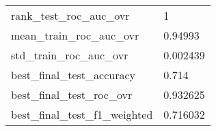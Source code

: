 \begin{tabular}{ll}
rank\_test\_roc\_auc\_ovr       &                                                  1 \\
mean\_train\_roc\_auc\_ovr      &                                            0.94993 \\
std\_train\_roc\_auc\_ovr       &                                           0.002439 \\
best\_final\_test\_accuracy    &                                              0.714 \\
best\_final\_test\_roc\_ovr     &                                           0.932625 \\
best\_final\_test\_f1\_weighted &                                           0.716032 \\
\bottomrule
\end{tabular}
